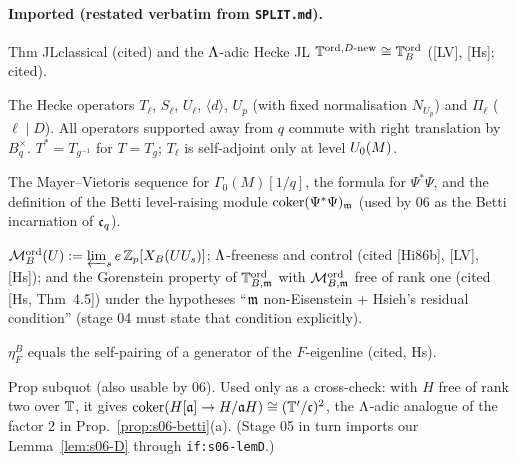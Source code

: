 \paragraph{Imported (restated verbatim from \texttt{SPLIT.md}).}
\begin{interface}
Thm JLclassical (cited) and the $\Lambda$-adic Hecke JL $\mathbb{T}^{\mathrm{ord},D\text{-new}}\cong\mathbb{T}^{\mathrm{ord}}_B$ ([LV], [Hs]; cited).
\end{interface}
\begin{interface}
The Hecke operators $T_\ell$, $S_\ell$, $U_\ell$, $\langle d\rangle$, $U_p$ (with fixed normalisation $N_{U_p}$) and $\Pi_\ell$
($\ell\mid D$). All operators supported away from $q$ commute with right translation by $B_q^\times$. $T^*=T_{g^{-1}}$ for
$T=T_g$; $T_\ell$ is self-adjoint only at level $U_0(M)$.
 
\end{interface}
\begin{interface}
The Mayer--Vietoris sequence for $\Gamma_0(M)[1/q]$, the formula for $\Psi^*\Psi$, and the definition of the Betti level-raising
module $\operatorname{coker}(\Psi^*\Psi)_{\mathfrak{m}}$ (used by 06 as the Betti incarnation of $\mathfrak{c}_q$). 
\end{interface}
\begin{interface}
$\mathcal{M}^{\mathrm{ord}}_B(U):=\varprojlim_se\,\mathbb{Z}_p[X_B(UU_s)]$; $\Lambda$-freeness and control (cited [Hi86b], [LV], [Hs]); and the Gorenstein property
of $\mathbb{T}^{\mathrm{ord}}_{B,\mathfrak{m}}$ with $\mathcal{M}^{\mathrm{ord}}_{B,\mathfrak{m}}$ free of rank one (cited [Hs, Thm~4.5]) under the hypotheses ``$\mathfrak{m}$ non-Eisenstein $+$
Hsieh's residual condition'' (stage 04 must state that condition explicitly). 
\end{interface}
\begin{interface}
$\eta^B_F$ equals the self-pairing of a generator of the $F$-eigenline (cited, Hs). 
\end{interface}
\begin{interface}
Prop subquot (also usable by 06).  Used only as a cross-check: with $H$ free of rank two over $\mathbb{T}$,
it gives $\operatorname{coker}(H[\mathfrak{a}]\to H/\mathfrak{a} H)\cong(\mathbb{T}'/\mathfrak{c})^2$, the $\Lambda$-adic analogue of the factor $2$ in Prop.~\ref{prop:s06-betti}(a).
(Stage 05 in turn imports our Lemma~\ref{lem:s06-D} through \texttt{if:s06-lemD}.) 
\end{interface}

